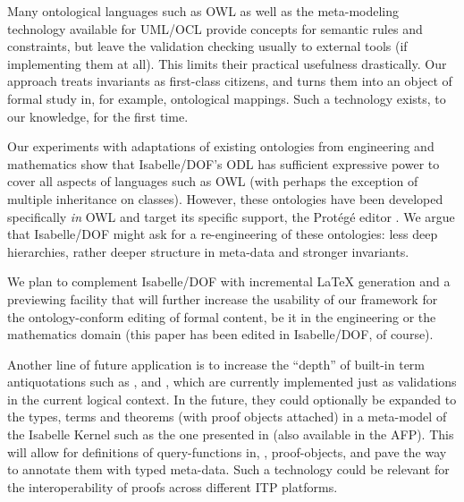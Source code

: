 \begin{isabellebody}
\begin{isamarkuptext}
Many ontological languages such as OWL as well as the meta-modeling technology 
available for UML/OCL provide concepts for semantic rules and constraints, but
leave the validation checking usually to external tools (if implementing them at all).
This limits their practical usefulness drastically. Our approach treats invariants as 
first-class citizens, and turns them into an object of formal study in, for example, 
ontological mappings. Such a technology exists, to our knowledge, for the first time.

Our experiments with adaptations of existing ontologies from engineering and mathematics
show that Isabelle/DOF's ODL has sufficient expressive power to cover all aspects
of languages such as OWL (with perhaps the exception of multiple inheritance on classes).
However, these ontologies have been developed specifically \emph{in} OWL and target
its specific support, the Protégé editor \cite{protege}. We argue that Isabelle/DOF might ask 
for a re-engineering of these ontologies: less deep hierarchies, rather deeper structure 
in meta-data and stronger invariants.
\end{isamarkuptext}\isamarkuptrue%

\begin{isamarkuptext}
We plan to complement Isabelle/DOF with incremental LaTeX generation and a previewing facility
that will further increase the usability of our framework for the ontology-conform editing
of formal content, be it in the engineering or the mathematics domain
(this paper has been edited in Isabelle/DOF, of course).

Another line of future application is to increase the ``depth'' of built-in term antiquotations such
as ,  and , which are currently implemented 
just as validations in the current logical context. In the future, they could  optionally be expanded 
to the types, terms and theorems (with proof objects attached) in a meta-model of the Isabelle Kernel 
such as the one presented in \cite{10.1007/978-3-030-79876-5_6} (also available in the AFP). 
This will allow for definitions of query-functions in, \eg, proof-objects, and pave the way 
to annotate them with typed meta-data. Such a technology could be relevant for the interoperability 
of proofs across different ITP platforms.
\end{isamarkuptext}\isamarkuptrue%
%
\isadelimtheory
%
\endisadelimtheory
%
\isatagtheory
%
\endisatagtheory
{\isafoldtheory}%
%
\isadelimtheory
%
\endisadelimtheory
%
\end{isabellebody}%
